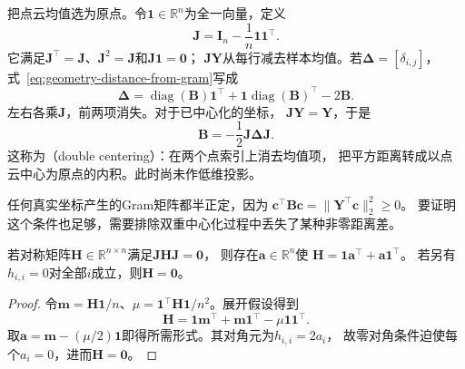 把点云均值选为原点。令$\bm1\in\mathbb R^n$为全一向量，定义
\begin{equation}
  \bm J=\bm I_n-\frac1n\bm1\bm1^\top.
  \label{eq:geometry-centering-matrix}
\end{equation}
它满足$\bm J^\top=\bm J$、$\bm J^2=\bm J$和$\bm J\bm1=\bm0$；
$\bm J\bm Y$从每行减去样本均值。若$\bm\Delta=[\delta_{i,j}]$，
式~\eqref{eq:geometry-distance-from-gram}写成
\[
  \bm\Delta=\operatorname{diag}(\bm B)\bm1^\top
  +\bm1\operatorname{diag}(\bm B)^\top-2\bm B.
\]
左右各乘$\bm J$，前两项消失。对于已中心化的坐标，
$\bm J\bm Y=\bm Y$，于是
\begin{equation}
  \bm B=-\frac12\bm J\bm\Delta\bm J.
  \label{eq:geometry-double-centering}
\end{equation}
这称为（double centering）：在两个点索引上消去均值项，
把平方距离转成以点云中心为原点的内积。此时尚未作低维投影。

任何真实坐标产生的Gram矩阵都半正定，因为
$\bm c^\top\bm B\bm c=\lVert\bm Y^\top\bm c\rVert_2^2\geq0$。
要证明这个条件也足够，需要排除双重中心化过程中丢失了某种非零距离差。

\begin{lemma}[双重中心化核的形式]
\label{lem:geometry-double-centering-kernel}
若对称矩阵$\bm H\in\mathbb R^{n\times n}$满足$\bm J\bm H\bm J=\bm0$，
则存在$\bm a\in\mathbb R^n$使
$\bm H=\bm1\bm a^\top+\bm a\bm1^\top$。
若另有$h_{i,i}=0$对全部$i$成立，则$\bm H=\bm0$。
\end{lemma}
\begin{proof}
令$\bm m=\bm H\bm1/n$、$\mu=\bm1^\top\bm H\bm1/n^2$。展开假设得到
\[
  \bm H=\bm1\bm m^\top+\bm m\bm1^\top-\mu\bm1\bm1^\top.
\]
取$\bm a=\bm m-(\mu/2)\bm1$即得所需形式。其对角元为$h_{i,i}=2a_i$，
故零对角条件迫使每个$a_i=0$，进而$\bm H=\bm0$。
\end{proof}

